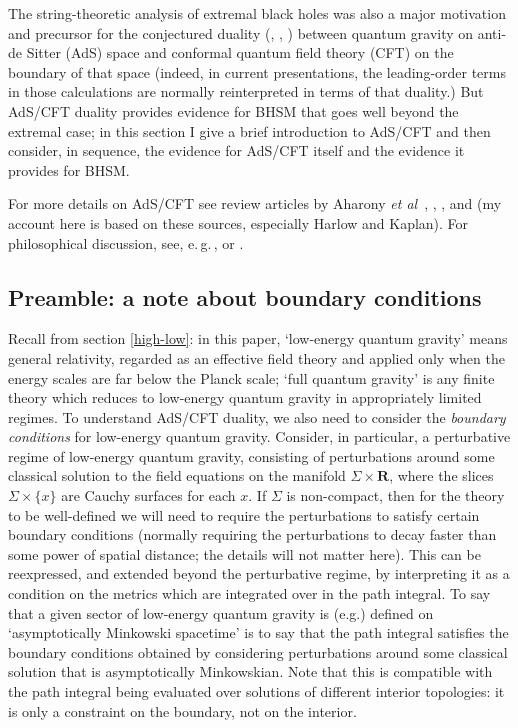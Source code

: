 \documentclass{article}
\newcommand{\egc}{\mbox{e.\,g.\,}}
\newcommand{\re}{\ensuremath{\mathbf{R}}}
\begin{document}
The string-theoretic analysis of extremal black holes was also a major motivation and precursor for the conjectured duality (, , ) between quantum gravity on anti-de Sitter (AdS) space and conformal quantum field theory (CFT) on the boundary of that space (indeed, in current presentations, the leading-order terms in those calculations are normally reinterpreted in terms of that duality.) But AdS/CFT duality provides evidence for BHSM that goes well beyond the extremal case; in this section I give a brief introduction to AdS/CFT and then consider, in sequence, the evidence for AdS/CFT itself and the evidence it provides for BHSM.

For more details on AdS/CFT see review articles by Aharony \emph{et al}~\citeyear{aharonyadscftreview}, , , and  (my account here is based on these sources, especially Harlow and Kaplan). For philosophical discussion, see, \egc,  or .

\subsection{Preamble: a note about boundary conditions}

Recall from section \ref{high-low}: in this paper, `low-energy quantum gravity' means general relativity, regarded as an effective field theory and applied only when the energy scales are far below the Planck scale; `full quantum gravity' is any finite theory which reduces to low-energy quantum gravity in appropriately limited regimes. To understand AdS/CFT duality, we also need to consider the \emph{boundary conditions} for low-energy quantum gravity. Consider, in particular, a perturbative regime of low-energy quantum gravity, consisting of perturbations around some classical solution to the field equations on the manifold $\Sigma \times \re$, where the slices $\Sigma \times \{x\}$ are Cauchy surfaces for each $x$. If $\Sigma$ is non-compact, then for the theory to be well-defined we will need to require the perturbations to satisfy certain boundary conditions (normally requiring the perturbations to decay faster than some power of spatial distance; the details will not matter here). This can be reexpressed, and extended beyond the perturbative regime, by interpreting it as a condition on the metrics which are integrated over in the path integral. To say that a given sector of low-energy quantum gravity is (e.g.) defined on `asymptotically Minkowski spacetime' is to say that the path integral satisfies the boundary conditions obtained by considering perturbations around some classical solution that is asymptotically Minkowskian. Note that this is compatible with the path integral being evaluated over solutions of different interior topologies: it is only a constraint on the boundary, not on the interior.
\end{document}

